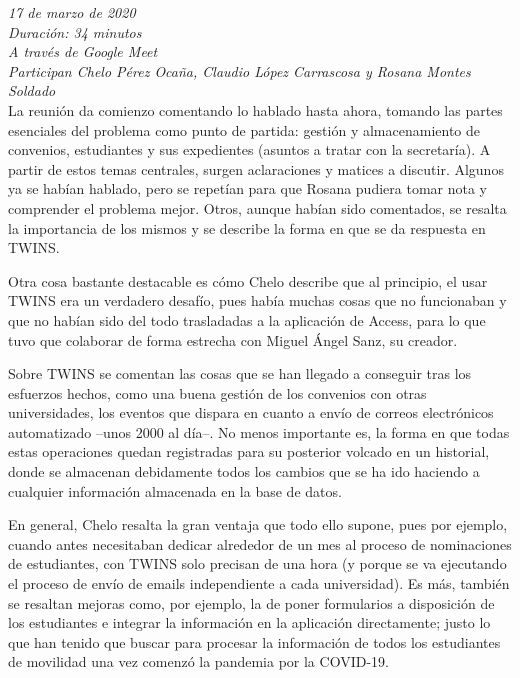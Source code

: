 	\textit{17 de marzo de 2020}\\
	
	\textit{Duración: 34 minutos}\\
	
	\textit{A través de Google Meet}\\
	
	\textit{Participan Chelo Pérez Ocaña, Claudio López Carrascosa y Rosana Montes Soldado}\\
	
	La reunión da comienzo comentando lo hablado hasta ahora, tomando las partes esenciales del problema como punto de partida: gestión y almacenamiento de convenios, estudiantes y sus expedientes (asuntos a tratar con la secretaría). A partir de estos temas centrales, surgen aclaraciones y matices a discutir. Algunos ya se habían hablado, pero se repetían para que Rosana pudiera tomar nota y comprender el problema mejor. Otros, aunque habían sido comentados, se resalta la importancia de los mismos y se describe la forma en que se da respuesta en TWINS.
	
	Otra cosa bastante destacable es cómo Chelo describe que al principio, el usar TWINS era un verdadero desafío, pues había muchas cosas que no funcionaban y que no habían sido del todo trasladadas a la aplicación de Access, para lo que tuvo que colaborar de forma estrecha con Miguel Ángel Sanz, su creador.
	
	Sobre TWINS se comentan las cosas que se han llegado a conseguir tras los esfuerzos hechos, como una buena gestión de los convenios con otras universidades, los eventos que dispara en cuanto a envío de correos electrónicos automatizado --unos 2000 al día--. No menos importante es, la forma en que todas estas operaciones quedan registradas para su posterior volcado en un historial, donde se almacenan debidamente todos los cambios que se ha ido haciendo a cualquier información almacenada en la base de datos.
	
	En general, Chelo resalta la gran ventaja que todo ello supone, pues por ejemplo, cuando antes necesitaban dedicar alrededor de un mes al proceso de nominaciones de estudiantes, con TWINS solo precisan de una hora (y porque se va ejecutando el proceso de envío de emails independiente a cada universidad). Es más, también se resaltan mejoras como, por ejemplo, la de poner formularios a disposición de los estudiantes e integrar la información en la aplicación directamente; justo lo que han tenido que buscar para procesar la información de todos los estudiantes de movilidad una vez comenzó la pandemia por la COVID-19.
	
